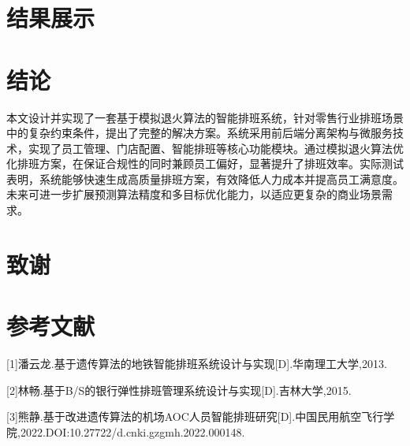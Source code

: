 \documentclass{ctexart}
\begin{document}
\section{结果展示}

\section{结论}
本文设计并实现了一套基于模拟退火算法的智能排班系统，针对零售行业排班场景中的复杂约束条件，提出了完整的解决方案。系统采用前后端分离架构与微服务技术，实现了员工管理、门店配置、智能排班等核心功能模块。通过模拟退火算法优化排班方案，在保证合规性的同时兼顾员工偏好，显著提升了排班效率。实际测试表明，系统能够快速生成高质量排班方案，有效降低人力成本并提高员工满意度。未来可进一步扩展预测算法精度和多目标优化能力，以适应更复杂的商业场景需求。

\section*{致谢}

\section*{参考文献}
[1]潘云龙.基于遗传算法的地铁智能排班系统设计与实现[D].华南理工大学,2013.

[2]林畅.基于B/S的银行弹性排班管理系统设计与实现[D].吉林大学,2015.

[3]熊静.基于改进遗传算法的机场AOC人员智能排班研究[D].中国民用航空飞行学院,2022.DOI:10.27722/d.cnki.gzgmh.2022.000148.

\appendix
{}

\end{document}
